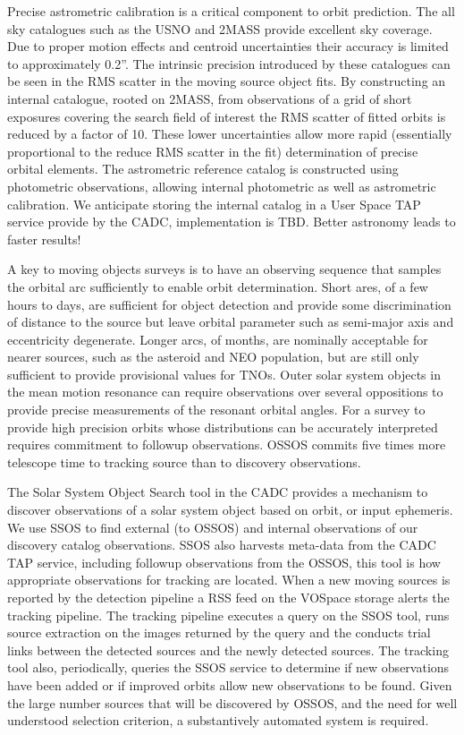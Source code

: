 Precise astrometric calibration is a critical component to orbit prediction. The all sky catalogues such as the USNO and 2MASS provide excellent sky coverage. Due to proper motion effects and centroid uncertainties their accuracy  is limited to approximately 0.2''. The intrinsic precision introduced by these catalogues can be seen in the RMS scatter in the moving source object fits. By constructing an internal catalogue, rooted on 2MASS, from observations of a grid of short exposures covering the search field of interest the RMS scatter of fitted orbits is reduced by a factor of 10. These lower uncertainties allow more rapid (essentially proportional to the reduce RMS scatter in the fit) determination of precise orbital elements. The astrometric reference catalog is constructed using photometric observations, allowing internal photometric as well as astrometric calibration. We anticipate storing the internal catalog in a User Space TAP service provide by the CADC, implementation is TBD. Better astronomy leads to faster results!


A key to moving objects surveys is to have an observing sequence that samples the orbital arc sufficiently to enable orbit determination. Short ares, of a few hours to days, are sufficient for object detection and provide some discrimination of distance to the source but leave orbital parameter such as semi-major axis and eccentricity degenerate. Longer arcs, of months, are nominally acceptable for nearer sources, such as the asteroid and NEO population, but are still only sufficient to provide provisional values for TNOs. Outer solar system objects in the mean motion resonance can require observations over several oppositions to provide precise measurements of the resonant orbital angles. For a survey to provide high precision orbits whose distributions can be accurately interpreted requires commitment to followup observations. OSSOS commits five times more telescope time to tracking source than to discovery observations. 

The Solar System Object Search \citep[SSOS,][]{2012PASP..124..579G} tool in the CADC provides a mechanism to discover observations of a solar system object based on orbit, or input ephemeris. We use  SSOS to find external (to OSSOS)  and internal observations of our discovery catalog observations. SSOS also harvests meta-data from the CADC TAP service,  including followup observations from the  OSSOS, this tool is how appropriate observations for tracking are located. When a new moving sources is reported by the detection pipeline a RSS feed on the VOSpace storage alerts the tracking pipeline. The tracking pipeline executes a query on the SSOS tool, runs source extraction on the images returned by the query and the conducts trial links between the detected sources and the newly detected sources. The tracking tool also, periodically, queries the SSOS service to determine if new observations have been added or if improved orbits allow new observations to be found. Given the large number sources that will be discovered by OSSOS, and the need for well understood selection criterion, a substantively automated system is required.

